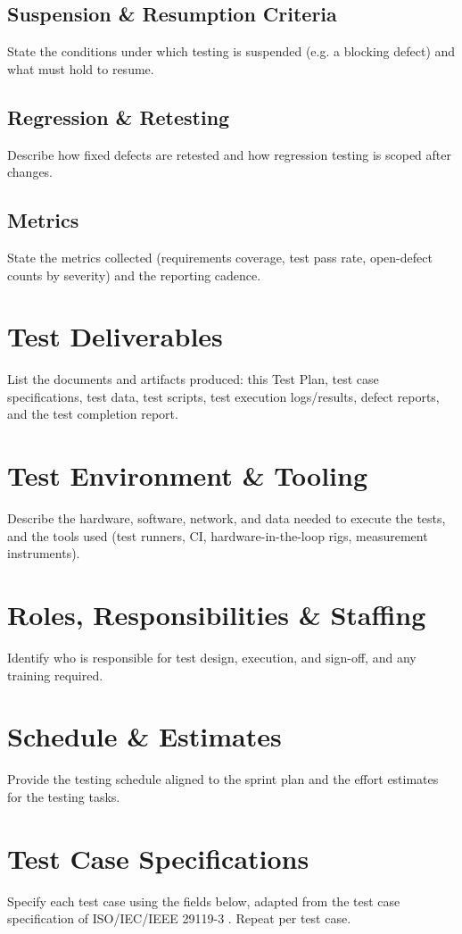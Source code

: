 \documentclass[11pt,letterpaper]{article}
\begin{document}
\subsection{Suspension \& Resumption Criteria}
State the conditions under which testing is suspended (e.g. a blocking defect) and what must hold to resume.

\subsection{Regression \& Retesting}
Describe how fixed defects are retested and how regression testing is scoped after changes.

\subsection{Metrics}
State the metrics collected (requirements coverage, test pass rate, open-defect counts by severity) and the reporting cadence.

\section{Test Deliverables}
List the documents and artifacts produced: this Test Plan, test case specifications, test data, test scripts, test execution logs/results, defect reports, and the test completion report.

\section{Test Environment \& Tooling}
Describe the hardware, software, network, and data needed to execute the tests, and the tools used (test runners, CI, hardware-in-the-loop rigs, measurement instruments).

\section{Roles, Responsibilities \& Staffing}
Identify who is responsible for test design, execution, and sign-off, and any training required.

\section{Schedule \& Estimates}
Provide the testing schedule aligned to the sprint plan and the effort estimates for the testing tasks.

\section{Test Case Specifications}
Specify each test case using the fields below, adapted from the test case specification of ISO/IEC/IEEE 29119-3 \cite{ISO29119part3}. Repeat per test case.
\end{document}
